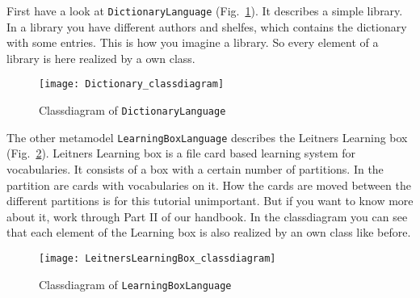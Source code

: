 First have a look at \texttt{DictionaryLanguage} (Fig.~\ref{ea:classdiagram_DictionaryLanguage}). It  describes a simple library. In a library you have different authors and shelfes, which contains the dictionary with some entries. This is how you imagine a library. So every element of a library is here realized by a own class. 

\begin{figure}[htbp]
	\centering
  \texttt{[image: Dictionary\_classdiagram]}
	\caption{Classdiagram of \texttt{Dictionary\-Language}} 
	\label{ea:classdiagram_DictionaryLanguage} 
\end{figure}

The other metamodel \texttt{Learning\-Box\-Language} describes the Leitners Learning box (Fig.~\ref{ea:classdiagram_LearningBoxLanguage}). Leitners Learning box is a file card based learning system for vocabularies. It consists of a box with a certain number of partitions. In the partition are cards with vocabularies on it. How the cards are moved between the different partitions is for this tutorial unimportant. But if you want to know more about it, work through Part II of our handbook.
\newline
In the classdiagram you can see that each element of the Learning box is also realized by an own class like before.

\begin{figure}[htbp]
	\centering
  \texttt{[image: LeitnersLearningBox\_classdiagram]}
	\caption{Classdiagram of \texttt{Learning\-Box\-Language}} 
	\label{ea:classdiagram_LearningBoxLanguage} 
\end{figure}